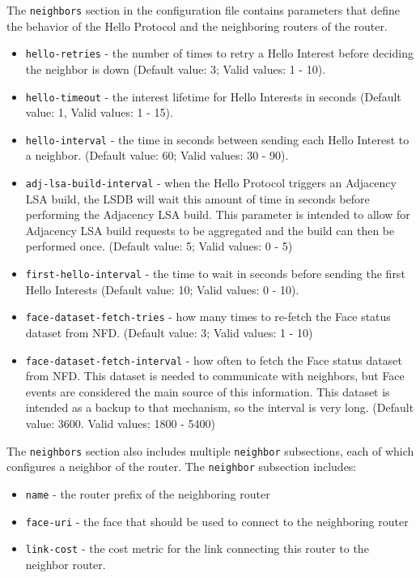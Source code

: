 The \texttt{neighbors} section in the configuration file contains parameters that define the behavior of the Hello Protocol and the neighboring routers of the router.
\begin{itemize}
\item \texttt{hello-retries} - the number of times to retry a Hello Interest before deciding the neighbor is down (Default value: 3; Valid values: 1 - 10).
\item \texttt{hello-timeout} - the interest lifetime for Hello Interests in seconds (Default value: 1, Valid values: 1 - 15).
\item \texttt{hello-interval} - the time in seconds between sending each Hello Interest to a neighbor. (Default value: 60; Valid values: 30 - 90).
\item \texttt{adj-lsa-build-interval} - when the Hello Protocol triggers an Adjacency LSA build, the LSDB will wait this amount of time in seconds before performing the Adjacency LSA build. This parameter is intended to allow for Adjacency LSA build requests to be aggregated and the build can then be performed once. (Default value: 5; Valid values: 0 - 5)
\item \texttt{first-hello-interval} -  the time to wait in seconds before sending the first Hello Interests (Default value: 10; Valid values: 0 - 10).
\item \texttt{face-dataset-fetch-tries} - how many times to re-fetch
  the Face status dataset from NFD. (Default value: 3; Valid values: 1 - 10)
\item \texttt{face-dataset-fetch-interval} - how often to fetch the
  Face status dataset from NFD. This dataset is needed to communicate
  with neighbors, but Face events are considered the main source of
  this information. This dataset is intended as a backup to that
  mechanism, so the interval is very long. (Default value: 3600. 
  Valid values: 1800 - 5400)
\end{itemize}

The \texttt{neighbors} section also includes multiple \texttt{neighbor} subsections, each of which configures a neighbor of the router.
The \texttt{neighbor} subsection includes:
\begin{itemize}
\item \texttt{name} - the router prefix of the neighboring router
\item \texttt{face-uri} - the face that should be used to connect to the neighboring router
\item \texttt{link-cost} - the cost metric for the link connecting this router to the neighbor router.
\end{itemize}

